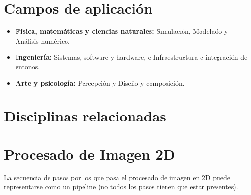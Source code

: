 \section{Campos de aplicación}\label{sec:campos-de-aplicación}
\begin{itemize}
	\item \textbf{Física, matemáticas y ciencias naturales:} Simulación, Modelado y Análisis numérico.
	\item \textbf{Ingeniería:} Sistemas, software y hardware, e Infraestructura e integración de entonos.
	\item \textbf{Arte y psicología:} Percepción y Diseño y composición.
\end{itemize}

\section{Disciplinas relacionadas}\label{sec:disciplinas-relacionadas}
\begin{figure}[H]
	{\def\svgwidth{.8\textwidth}
		}
\end{figure}

\section{Procesado de Imagen 2D}\label{sec:procesado-de-imagen-2d}
La secuencia de pasos por los que pasa el procesado de imagen en 2D puede representarse como un pipeline (no todos los pasos tienen que estar presentes).
\begin{figure}[H]
	{\def\svgwidth{.8\textwidth}
		}
\end{figure}

